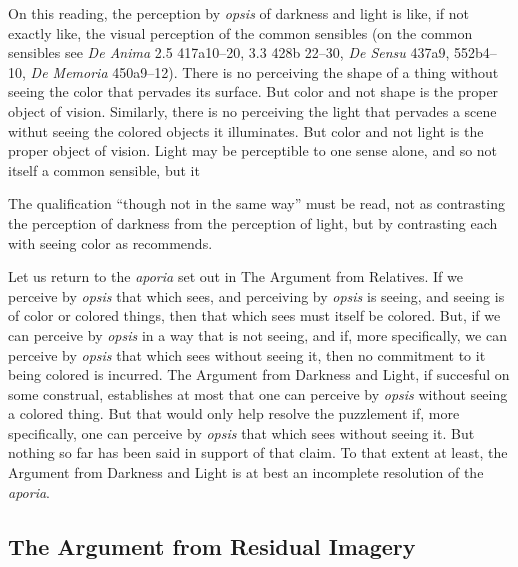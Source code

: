 On this reading, the perception by \emph{opsis} of darkness and light is like, if not exactly like, the visual perception of the common sensibles (on the common sensibles see \emph{De Anima} 2.5 417a10–20, 3.3 428b 22–30, \emph{De Sensu} 437a9, 552b4–10, \emph{De Memoria} 450a9–12). There is no perceiving the shape of a thing without seeing the color that pervades its surface. But color and not shape is the proper object of vision. Similarly, there is no perceiving the light that pervades a scene withut seeing the colored objects it illuminates. But color and not light is the proper object of vision. Light may be perceptible to one sense alone, and so not itself a common sensible, but it 

The qualification ``though not in the same way'' must be read, not as contrasting the perception of darkness from the perception of light, but by contrasting each with seeing color as \citet[275]{Ross:1961uq} recommends.

Let us return to the \emph{aporia} set out in The Argument from Relatives. If we perceive by \emph{opsis} that which sees, and perceiving by \emph{opsis} is seeing, and seeing is of color or colored things, then that which sees must itself be colored. But, if we can perceive by \emph{opsis} in a way that is not seeing, and if, more specifically, we can perceive by \emph{opsis} that which sees without seeing it, then no commitment to it being colored is incurred. The Argument from Darkness and Light, if succesful on some construal, establishes at most that one can perceive by \emph{opsis} without seeing a colored thing. But that would only help resolve the puzzlement if, more specifically, one can perceive by \emph{opsis} that which sees without seeing it. But nothing so far has been said in support of that claim. To that extent at least, the Argument from Darkness and Light is at best an incomplete resolution of the \emph{aporia}.


\subsection{The Argument from Residual Imagery} %
\label{sub:the_argument_from_residual_imagery}

